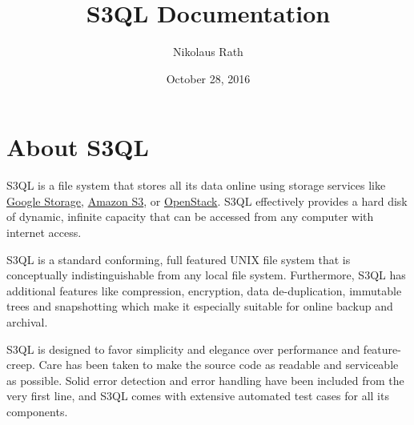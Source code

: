 \documentclass[letterpaper,10pt,english]{sphinxmanual}
\title{S3QL Documentation}
\date{October 28, 2016}
\author{Nikolaus Rath}
\begin{document}
\maketitle
\tableofcontents
{}\label{index::doc}



\chapter{About S3QL}
\label{about::doc}\label{about:s3ql-user-s-guide}\label{about:about-s3ql}
S3QL is a file system that stores all its data online using storage
services like \href{http://code.google.com/apis/storage/}{Google Storage}, \href{http://aws.amazon.com/s3}{Amazon S3}, or \href{http://openstack.org/projects/storage/}{OpenStack}. S3QL
effectively provides a hard disk of dynamic, infinite capacity that
can be accessed from any computer with internet access.

S3QL is a standard conforming, full featured UNIX file system that is
conceptually indistinguishable from any local file system.
Furthermore, S3QL has additional features like compression,
encryption, data de-duplication, immutable trees and snapshotting
which make it especially suitable for online backup and archival.

S3QL is designed to favor simplicity and elegance over performance and
feature-creep. Care has been taken to make the source code as
readable and serviceable as possible. Solid error detection and error
handling have been included from the very first line, and S3QL comes
with extensive automated test cases for all its components.
\end{document}
